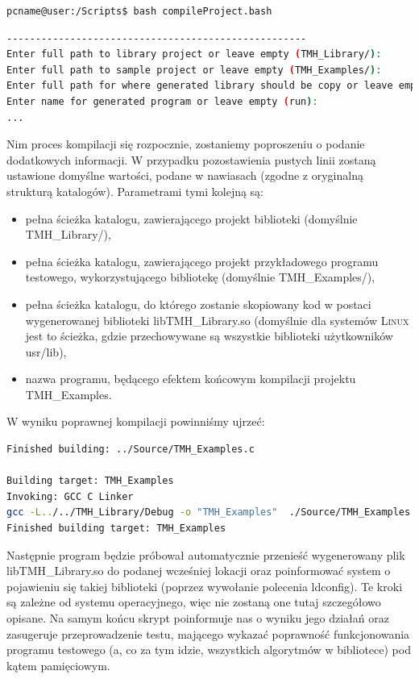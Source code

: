 \begin{lstlisting}[language=bash]
pcname@user:/Scripts$ bash compileProject.bash
\end{lstlisting}

\small
\begin{lstlisting}[language=bash]
----------------------------------------------------
Enter full path to library project or leave empty (TMH_Library/):
Enter full path to sample project or leave empty (TMH_Examples/):
Enter full path for where generated library should be copy or leave empty (/usr/lib):
Enter name for generated program or leave empty (run):
...
\end{lstlisting}
\normalsize

Nim proces kompilacji się rozpocznie, zostaniemy poproszeniu o podanie dodatkowych informacji. W przypadku pozostawienia pustych linii zostaną ustawione domyślne wartości, podane w nawiasach (zgodne z oryginalną strukturą katalogów). Parametrami tymi kolejną są:

\begin{itemize}
\item pełna ścieżka katalogu, zawierającego projekt biblioteki (domyślnie \textsf{TMH\_Library/}),
\item pełna ścieżka katalogu, zawierającego projekt przykładowego programu testowego, wykorzystującego bibliotekę (domyślnie \textsf{TMH\_Examples/}),
\item pełna ścieżka katalogu, do którego zostanie skopiowany kod w postaci wygenerowanej biblioteki \textsf{libTMH\_Library.so} (domyślnie dla systemów \textsc{Linux} jest to ścieżka, gdzie przechowywane są wszystkie biblioteki użytkowników \textsf{usr/lib}),
\item nazwa programu, będącego efektem końcowym kompilacji projektu \textsf{TMH\_Examples}.
\end{itemize}

W wyniku poprawnej kompilacji powinniśmy ujrzeć:

\small
\begin{lstlisting}[language=bash]
Finished building: ../Source/TMH_Examples.c
 
Building target: TMH_Examples
Invoking: GCC C Linker
gcc -L../../TMH_Library/Debug -o "TMH_Examples"  ./Source/TMH_Examples.o   -lTMH_Library
Finished building target: TMH_Examples
\end{lstlisting}
\normalsize

Następnie program będzie próbował automatycznie przenieść wygenerowany plik \textsf{libTMH\_Library.so} do podanej wcześniej lokacji oraz poinformować system o pojawieniu się takiej biblioteki (poprzez wywołanie polecenia \textsf{ldconfig}). Te kroki są zależne od systemu operacyjnego, więc nie zostaną one tutaj szczegółowo opisane. Na samym końcu skrypt poinformuje nas o wyniku jego działań oraz zasugeruje przeprowadzenie testu, mającego wykazać poprawność funkcjonowania programu testowego (a, co za tym idzie, wszystkich algorytmów w bibliotece) pod kątem pamięciowym.

